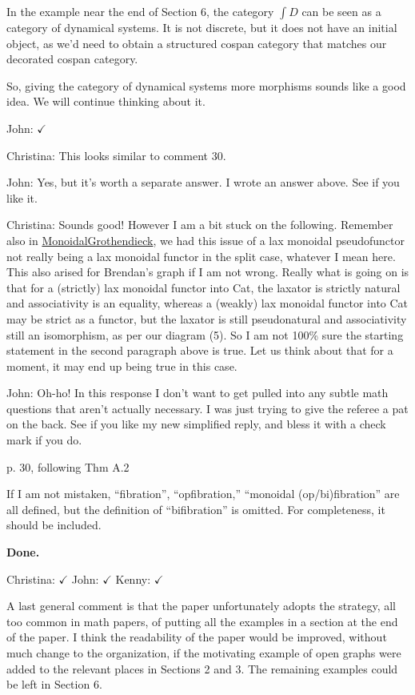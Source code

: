 \documentclass[reqno]{amsart}
\def\chris{\color{purple} Christina: }
\def\john{\color{red} John: }
\def\kenny{\color{blue} Kenny: }
\begin{document}
\begin{enumerate}
{{In the example near the end of Section 6, the category $\int \! D$ can be seen as a category
of dynamical systems.   It is not discrete, but it does not have an initial object, as we'd
need to obtain a structured cospan
category that matches our decorated cospan category.   

So, giving the category of dynamical systems more morphisms sounds like a good idea. We will continue thinking about it.}  { \john $\checkmark$}

{\chris This looks similar to comment 30.}

{\john Yes, but it's worth a separate answer.   I wrote an answer above.  See if you like it.  }

{\chris Sounds good! However I am a bit stuck on the following. Remember also in 
\href{https://thalis.math.upatras.gr/~cvasilak/documents/MonGroth.pdf}{MonoidalGrothendieck}, we had this issue of a lax monoidal pseudofunctor not 
really being a lax monoidal functor in the split case, whatever I mean here. This also arised for Brendan's graph if I am not wrong. Really what is 
going on is that for a (strictly) lax monoidal functor into Cat, the laxator is strictly natural and associativity is an equality, whereas a (weakly) 
lax monoidal functor into Cat may be strict as a functor, but the laxator is still pseudonatural and associativity still an isomorphism, as per our 
diagram (5). So I am not 100\% sure the starting statement in the second paragraph above is true. Let us think about that for a moment, it may end up 
being true in this case.}

{\john  Oh-ho!  In this response I don't want to get pulled into any subtle math questions that aren't  actually necessary.  I was just trying to give the referee a pat on the back.  See if you like my new simplified reply, and bless it with a check mark if you do.}

\item p. 30, following Thm A.2

If I am not mistaken, “fibration”, “opfibration,” “monoidal (op/bi)fibration” are all defined, but the definition of “bifibration” is omitted. For 
completeness, it should be included.

{\bf Done.} 

{\chris $\checkmark$} {\john $\checkmark$}  {\kenny $\checkmark$}

\item A last general comment is that the paper unfortunately adopts the strategy, all too common in math papers, of putting all the examples in a 
section at 
the end of the paper. I think the readability of the paper would be improved, without much change to the organization, if the motivating example of 
open graphs were added to the relevant places in Sections 2 and 3. The remaining examples could be left in Section 6.

}
\end{enumerate}
\end{document}
